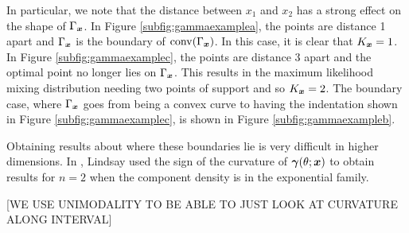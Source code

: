 		In particular, we note that the distance between $x_1$ and $x_2$ has a strong effect on the shape of $\Gamma_{\bm{{x}}}$. In Figure \ref{subfig:gammaexamplea}, the points are distance 1 apart and $\Gamma_{\bm{{x}}}$ is the boundary of $\mathrm{conv}(\Gamma_{\bm{{x}}})$. In this case, it is clear that $K_{\bm{{x}}} = 1$. In Figure \ref{subfig:gammaexamplec}, the points are distance 3 apart and the optimal point no longer lies on $\Gamma_{\bm{{x}}}$. This results in the maximum likelihood mixing distribution needing two points of support and so $K_{\bm{{x}}} = 2$. The boundary case, where $\Gamma_{\bm{{x}}}$ goes from being a convex curve to having the indentation shown in Figure \ref{subfig:gammaexamplec}, is shown in Figure \ref{subfig:gammaexampleb}.

		Obtaining results about where these boundaries lie is very difficult in higher dimensions. In \cite{Lindsay1983a-he}, Lindsay used the sign of the curvature of ${\bm{{\gamma}}}(\theta;{\bm{{x}}})$ to obtain results for $n=2$ when the component density is in the exponential family.

		[WE USE UNIMODALITY TO BE ABLE TO JUST LOOK AT CURVATURE ALONG INTERVAL]
	
		
		
		
		
		
		
